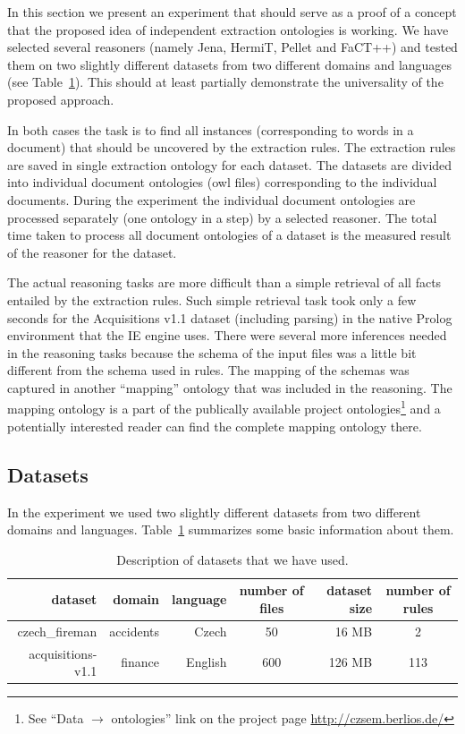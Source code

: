 In this section we present an experiment that should serve as a proof of a concept that the proposed idea of independent extraction ontologies is working. We have selected several reasoners (namely Jena, HermiT, Pellet and FaCT++) and tested them on two slightly different datasets from two different domains and languages (see Table~\ref{tab:datasets}). This should at least partially demonstrate the universality of the proposed approach.

In both cases the task is to find all instances (corresponding to words in a document) that should be uncovered by the extraction rules. The extraction rules are saved in single extraction ontology for each dataset. The datasets are divided into individual document ontologies (owl files) corresponding to the individual documents. During the experiment the individual document ontologies are processed separately (one ontology in a step) by a selected reasoner. The total time taken to process all document ontologies of a dataset is the measured result of the reasoner for the dataset.

The actual reasoning tasks are more difficult than a simple retrieval of all facts entailed by the extraction rules. Such simple retrieval task took only a few seconds for the Acquisitions v1.1 dataset (including parsing) in the native Prolog environment that the IE engine uses. There were several more inferences needed in the reasoning tasks because the schema of the input files was a little bit different from the schema used in rules. The mapping of the schemas was captured in another ``mapping'' ontology that was included in the reasoning. The mapping ontology is a part of the publically available project ontologies\footnote{See ``Data $\rightarrow$ ontologies'' link on the project page \url{http://czsem.berlios.de/}} and a potentially interested reader can find the complete mapping ontology there.


\subsection{Datasets}

In the experiment we used two slightly different datasets from two different domains and languages.  Table~\ref{tab:datasets} summarizes some basic information about them.

\begin{table}
\centering
\begin{tabular}{|r||r|r|c|r|c|}
\hline
dataset & domain & language & number of files & dataset size & number of rules\\
\hline
\hline
czech\_fireman & accidents & Czech & 50 & 16 MB & 2\\
\hline
acquisitions-v1.1 & finance & English & 600 & 126 MB & 113\\
\hline
\end{tabular}
\caption{Description of datasets that we have used.}
\label{tab:datasets}
\end{table}


